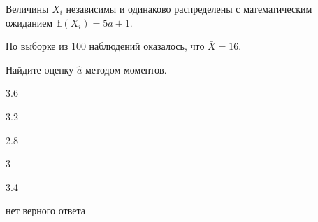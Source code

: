 
\begin{question}
Величины \(X_i\) независимы и одинаково распределены с математическим
ожиданием \(\mathbb{E}(X_i) = 5 a + 1\).

По выборке из 100 наблюдений оказалось, что \(\bar X = 16\).

Найдите оценку \(\hat a\) методом моментов.
\begin{answerlist}
  \item 3.6
  \item 3.2
  \item 2.8
  \item 3
  \item 3.4
  \item нет верного ответа
\end{answerlist}
\end{question}


